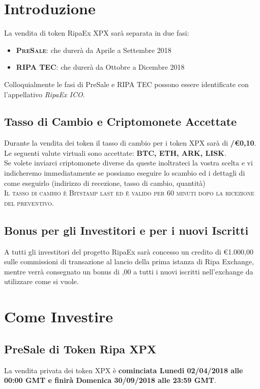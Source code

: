 \documentclass[11pt,fleqn]{book} %
\begin{document}
\section{Introduzione}
La vendita di token RipaEx XPX sarà separata in due fasi:
	\begin{itemize}
		\item \textbf{\textsc{PreSale}}: che durerà da Aprile a Settembre 2018
		\item \textbf{\textsc{RIPA TEC}}: che durerà da Ottobre a Dicembre 2018
	\end{itemize}
\vspace{5mm}
Colloquialmente le fasi di PreSale e RIPA TEC possono essere identificate con l'appellativo \textit{RipaEx ICO}.

\subsection{Tasso di Cambio e Criptomonete Accettate}
Durante la vendita dei token il tasso di cambio per i token XPX sarà di \textbf{\PHP/\euro0,10}.\\

Le seguenti valute virtuali sono accettate: \textbf{BTC, ETH, ARK, LISK}.\\

Se volete inviarci criptomonete diverse da queste inoltrateci la vostra scelta e vi indicheremo immediatamente
se possiamo eseguire lo scambio ed i dettagli di come eseguirlo (indirizzo di recezione, tasso di cambio,
quantità)\\

\textsc{Il tasso di cambio è Bitstamp last ed è valido per 60 minuti dopo la ricezione del preventivo}.

\subsection{Bonus per gli Investitori e per i nuovi Iscritti}
A tutti gli investitori del progetto RipaEx sarà concesso un credito di \euro1.000,00 sulle commissioni
di transazione al lancio della prima istanza di Ripa Exchange, mentre verrà consegnato un bonus di ,00
a tutti i nuovi iscritti nell'exchange da utilizzare come si vuole.

\section{Come Investire}
\subsection{PreSale di Token Ripa XPX}
La vendita privata dei token XPX è \textbf{cominciata Lunedi 02/04/2018 alle 00:00 GMT e finirà Domenica
30/09/2018 alle 23:59 GMT}.
\end{document}
